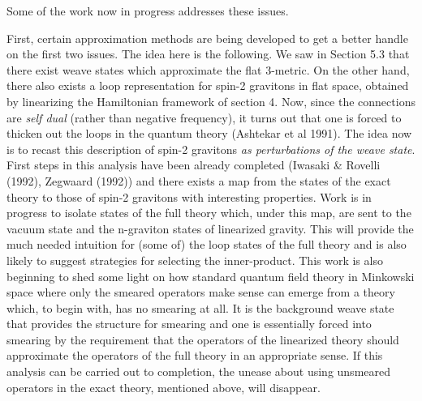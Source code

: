 Some of the work now in progress addresses these issues.

First, certain approximation methods are being developed to get a better handle
on the first two issues.  The idea here is the following.  We saw in Section
5.3 that there exist weave states which approximate the flat 3-metric.  On the
other hand, there also exists a loop representation for spin-2 gravitons in
flat space, obtained by linearizing the Hamiltonian framework of section 4.
Now, since the connections are {\it self dual} (rather than negative
frequency), it turns out that one is forced to thicken out the loops in the
quantum theory (Ashtekar et al 1991).  The idea now is to recast this
description of spin-2 gravitons {\it as perturbations of the weave state}.
First steps in this analysis have been already completed (Iwasaki \& Rovelli
(1992), Zegwaard (1992)) and there exists a map from the states of the exact
theory to those of spin-2 gravitons with interesting properties. Work is in
progress to isolate states of the full theory which, under this map, are sent
to the vacuum state and the n-graviton states of linearized gravity. This will
provide the much needed intuition for (some of) the loop states of the full
theory and is also likely to suggest strategies for selecting the
inner-product. This work is also beginning to shed some light on how standard
quantum field theory in Minkowski space where only the smeared operators make
sense can emerge from a theory which, to begin with, has no smearing at all.
It is the background weave state that provides the structure for smearing and
one is essentially forced into smearing by the requirement that the operators
of the linearized theory should approximate the operators of the full theory in
an appropriate sense. If this analysis can be carried out to completion, the
unease about using unsmeared operators in the exact theory, mentioned above,
will disappear.

